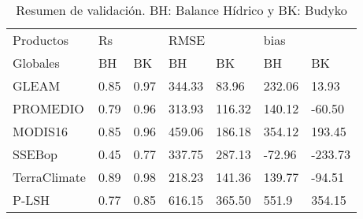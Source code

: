 \begin{table}[hbt]
\caption{Resumen de validación. BH: Balance Hídrico y BK: Budyko}
\label{tab:Table_r_rmse_bias}
\centering
\begin{tabular}{lllllll}
\hline
Productos    & \multicolumn{2}{l}{Rs} & \multicolumn{2}{l}{RMSE} & \multicolumn{2}{l}{bias} \\
Globales     & BH             & BK             & BH                   & BK                  & BH          & BK         \\  \hline
GLEAM        & 0.85           & 0.97           & 344.33               & 83.96               & 232.06      & 13.93      \\
PROMEDIO         & 0.79           & 0.96           & 313.93               & 116.32              & 140.12     & -60.50     \\
MODIS16      & 0.85           & 0.96           & 459.06               & 186.18              & 354.12      & 193.45     \\
SSEBop       & 0.45           & 0.77           & 337.75               & 287.13              & -72.96    & -233.73    \\
TerraClimate & 0.89           & 0.98           & 218.23               & 141.36              & 139.77     & -94.51     \\
P-LSH        & 0.77           & 0.85           & 616.15               & 365.50              & 551.9      & 354.15 \\ \hline    
\end{tabular}
\end{table}